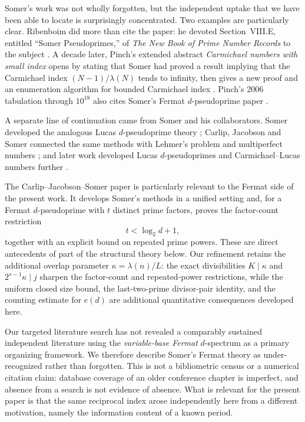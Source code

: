 \documentclass[11pt]{article}
\begin{document}
Somer's work was not wholly forgotten, but the independent uptake that we
have been able to locate is surprisingly concentrated.  Two examples are
particularly clear.  Ribenboim did more than cite the paper: he devoted
Section~VIII.E, entitled ``Somer Pseudoprimes,'' of \emph{The New Book of Prime
Number Records} to the subject \cite[p.~117]{Ribenboim1996}.  A decade later,
Pinch's extended abstract \emph{Carmichael numbers with small index} opens by
stating that Somer had proved a result implying that the Carmichael index
$(N-1)/\lambda(N)$ tends to infinity, then gives a new proof and an enumeration
algorithm for bounded Carmichael index \cite{PinchSmallIndex}.  Pinch's 2006
tabulation through $10^{18}$ also cites Somer's Fermat $d$-pseudoprime paper
\cite{Pinch2006e18}.

A separate line of continuation came from Somer and his collaborators.  Somer
developed the analogous Lucas $d$-pseudoprime theory \cite{SomerLucas1998};
Carlip, Jacobson and Somer connected the same methods with Lehmer's problem and
multiperfect numbers \cite{CarlipJacobsonSomer1998}; and later work developed
Lucas $d$-pseudoprimes and Carmichael--Lucas numbers further
\cite{CarlipSomer2007}.

The Carlip--Jacobson--Somer paper is particularly relevant to the Fermat side
of the present work.  It develops Somer's methods in a unified setting and,
for a Fermat $d$-pseudoprime with $t$ distinct prime factors, proves the
factor-count restriction
\[
 t<\log_2 d+1,
\]
together with an explicit bound on repeated prime powers.  These are direct
antecedents of part of the structural theory below.  Our refinement retains the
additional overlap parameter $\kappa=\lambda(n)/L$: the exact divisibilities
$K\mid\kappa$ and $2^{s-1}\kappa\mid j$ sharpen the factor-count and
repeated-power restrictions, while the uniform closed size bound, the
last-two-prime divisor-pair identity, and the counting estimate for $e(d)$ are
additional quantitative consequences developed here.

Our targeted literature search has not revealed a comparably sustained
independent literature using the \emph{variable-base Fermat} $d$-spectrum as a
primary organizing framework.  We therefore describe Somer's Fermat theory as
under-recognized rather than forgotten.  This is not a bibliometric census or
a numerical citation claim: database coverage of an older conference chapter
is imperfect, and absence from a search is not evidence of absence.  What is
relevant for the present paper is that the same reciprocal index arose
independently here from a different motivation, namely the information content
of a known period.
\end{document}
